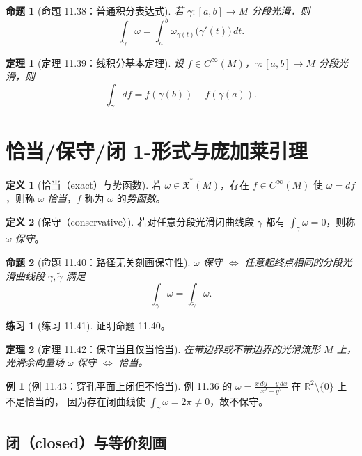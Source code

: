 \documentclass[12pt,a4paper]{article}
\theoremstyle{definition}
\newtheorem{definition}{定义}[section]
\newtheorem{example}{例}[section]
\newtheorem{exercise}{练习}[section]
\theoremstyle{plain}
\newtheorem{theorem}{定理}[section]
\newtheorem{proposition}{命题}[section]
\newcommand{\R}{\mathbb{R}}
\newcommand{\X}{\mathfrak{X}}
\newcommand{\Cinf}{C^{\infty}}
\begin{document}
\begin{proposition}[命题 11.38：普通积分表达式]
若 $\gamma:[a,b]\to M$ 分段光滑，则
\[
\int_\gamma\omega=\int_a^b \omega_{\gamma(t)}\big(\gamma'(t)\big)\,dt.
\]
\end{proposition}

\begin{theorem}[定理 11.39：线积分基本定理]
设 $f\in\Cinf(M)$，$\gamma:[a,b]\to M$ 分段光滑，则
\[
\int_\gamma df = f(\gamma(b)) - f(\gamma(a)).
\]
\end{theorem}

\section{恰当/保守/闭 1-形式与庞加莱引理}

\begin{definition}[恰当（exact）与势函数]
若 $\omega\in\X^*(M)$，存在 $f\in\Cinf(M)$ 使 $\omega=df$，则称 $\omega$ \emph{恰当}，$f$ 称为 $\omega$ 的\emph{势函数}。
\end{definition}

\begin{definition}[保守（conservative）]
若对任意分段光滑闭曲线段 $\gamma$ 都有 $\int_\gamma\omega=0$，则称 $\omega$ \emph{保守}。
\end{definition}

\begin{proposition}[命题 11.40：路径无关刻画保守性]
$\omega$ 保守 $\Longleftrightarrow$ 任意起终点相同的分段光滑曲线段 $\gamma,\tilde\gamma$ 满足
\[
\int_\gamma\omega=\int_{\tilde\gamma}\omega.
\]
\end{proposition}

\begin{exercise}[练习 11.41]
证明命题 11.40。
\end{exercise}

\begin{theorem}[定理 11.42：保守当且仅当恰当]
在带边界或不带边界的光滑流形 $M$ 上，光滑余向量场 $\omega$ 保守 $\Longleftrightarrow$ 恰当。
\end{theorem}

\begin{example}[例 11.43：穿孔平面上闭但不恰当]
例 11.36 的 $\omega=\frac{x\,dy-y\,dx}{x^2+y^2}$ 在 $\R^2\setminus\{0\}$ 上不是恰当的，
因为存在闭曲线使 $\int_\gamma\omega=2\pi\neq 0$，故不保守。
\end{example}

\subsection{闭（closed）与等价刻画}
\end{document}
